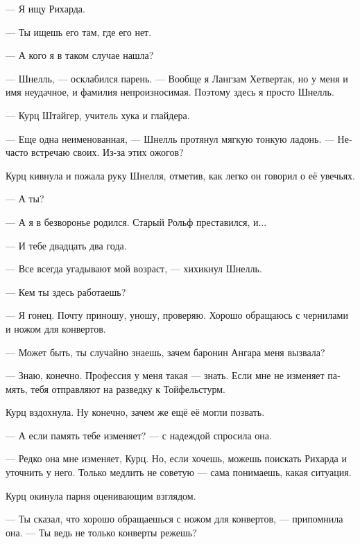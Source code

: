 \documentclass[a4paper,12pt,fleqn]{book}\usepackage{polyglossia}\setdefaultlanguage[babelshorthands=true]{russian}\setotherlanguage{english}\defaultfontfeatures{Ligatures=TeX,Mapping=tex-text}\usepackage{xcolor}\newcommand{\ml}[3]{#2}
\begin{document}
--- Я ищу Рихарда.

--- Ты ищешь его там, где его нет.

--- А кого я в таком случае нашла?

--- Шнелль, --- осклабился парень.
--- Вообще я Лангзам Хетвертак, но у меня и имя неудачное, и фамилия непроизносимая.
Поэтому здесь я просто Шнелль.

--- Курц Штайгер, учитель хука и глайдера.

--- Еще одна неименованная, --- Шнелль протянул мягкую тонкую ладонь.
--- Нечасто встречаю своих.
Из-за этих ожогов?

Курц кивнула и пожала руку Шнелля, отметив, как легко он говорил о её увечьях.

--- А ты?

--- А я в безворонье родился.
Старый Рольф преставился, и...

--- И тебе двадцать два года.

--- Все всегда угадывают мой возраст, --- хихикнул Шнелль.

--- Кем ты здесь работаешь?

--- Я гонец.
Почту приношу, уношу, проверяю.
Хорошо обращаюсь с чернилами и ножом для конвертов.

\ml{$0$}
{--- Может быть, ты случайно знаешь, зачем баронин Ангара меня вызвала?}
{``Maybe you know by chance, why Baronin Angara paged me?''}

\ml{$0$}
{--- Знаю, конечно.}
{``Of course I know.}
\ml{$0$}
{Профессия у меня такая --- знать.}
{That's my job, to know.}
\ml{$0$}
{Если мне не изменяет память, тебя отправляют на разведку к Тойфельстурм.}
{If I recall correctly, you're ordered to scout Teufelsturm.''}

Курц вздохнула.
Ну конечно, зачем же ещё её могли позвать.

\ml{$0$}
{--- А если память тебе изменяет? --- с надеждой спросила она.}
{``Is there any chance you recall incorrectly?'' she asked with hope.}

\ml{$0$}
{--- Редко она мне изменяет, Курц.}
{``That happens very rarely, Kurz.}
\ml{$0$}
{Но, если хочешь, можешь поискать Рихарда и уточнить у него.}
{But, if you insist, you can look for Richard and clear it with him.}
Только медлить не советую --- сама понимаешь, какая ситуация.

Курц окинула парня оценивающим взглядом.

--- Ты сказал, что хорошо обращаешься с ножом для конвертов, --- припомнила она.
\ml{$0$}
{--- Ты ведь не только конверты режешь?}
{``Your knife is good not only for envelopes, isn't it?''}
\end{document}
